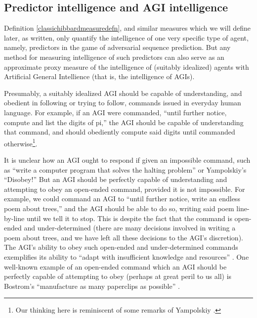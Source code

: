 \documentclass{article}
\begin{document}
\subsection{Predictor intelligence and AGI intelligence}
\label{agiproxysection}

Definition \ref{classichibbardmeasuredefn}, and similar measures which we will
define later, as written, only quantify the intelligence of one very specific type
of agent, namely, predictors in the game of adversarial sequence prediction.
But any method for measuring intelligence of such predictors can also serve as
an approximate proxy measure of the intelligence of (suitably idealized)
agents with Artificial General Intellience (that is, the intelligence of AGIs).

Presumably, a suitably idealized AGI should be capable of understanding, and
obedient in following or trying to follow, commands issued in everyday human language.
For example, if an AGI were commanded, ``until further notice, compute and list the
digits of pi,'' the AGI should be capable of understanding that command, and should
obediently compute said digits until commanded otherwise\footnote{Our thinking
here is reminiscent of some remarks of Yampolskiy \cite{yampolskiy2013turing}.}.

It is unclear how an AGI ought to respond if given an impossible command,
such as ``write a computer program
that solves the halting problem'' or Yampolskiy's \cite{yampolskiycontrol}
``Disobey!'' But an AGI should be perfectly capable of
understanding and attempting to obey an open-ended command, provided it is not
impossible. For example, we could command an AGI to ``until further notice,
write an endless poem about trees,'' and the AGI should be able to do so, writing
said poem line-by-line until we tell it to stop. This is despite the fact that the
command is open-ended and under-determined
(there are many decisions involved in writing a
poem about trees, and we have left all these decisions to the AGI's discretion).
The AGI's ability to obey such open-ended and under-determined commands
exemplifies its
ability to ``adapt with insufficient
knowledge and resources'' \cite{wang2019defining}.
One well-known example of an open-ended command which an AGI should be perfectly
capable of attempting to obey (perhaps at great peril to us all) is
Bostrom's ``manufacture as many paperclips as possible'' \cite{bostrom2003ethical}.
\end{document}
